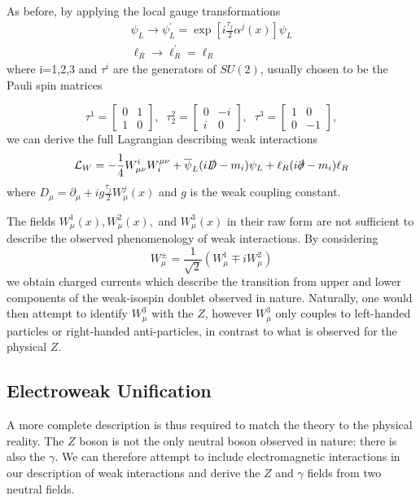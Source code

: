 \documentclass[10pt,a4paper]{book}
\begin{document}
As before, by applying the local gauge transformations
\begin{gather}
\label{weak gauge transformations}
\psi_L \rightarrow \psi_L^\prime = \exp\left[i \frac{\tau_j}{2}\alpha^j (x) \right]\psi_L \\
\ell_R \rightarrow \ell_R^\prime = \ell_R
\label{weak gauge transformations 2}
\end{gather}
where i=1,2,3 and $\tau^i$ are the generators of $SU(2)$, usually chosen to be the Pauli spin matrices

\begin{equation}
\tau^1 = \begin{bmatrix}
0 & 1  \\
1 & 0
\end{bmatrix}, \; \;
\tau^2_2 = \begin{bmatrix}
0 & -i  \\
i & 0
\end{bmatrix}, \; \;
\tau^3 = \begin{bmatrix}
1 & 0 \\
0 & -1
\end{bmatrix},
\end{equation}
we can derive the full Lagrangian describing weak interactions
\begin{equation}
\mathcal{L}_W = -\frac{1}{4}W^i_{\mu\nu}W^{\mu\nu}_i + \overline{\psi}_L(i\slashed{D} - m_i)\psi_{L} +  \ell_{R}(i\slashed{\partial} -m_i)\ell_{R}
\end{equation}
where $D_\mu = \partial_\mu +ig \frac{\tau_j}{2}W^j_\mu(x)$ and $g$ is the weak coupling constant.

The fields $W^1_\mu(x), W^2_\mu(x),$ and $W^3_\mu(x)$ in their raw form are not sufficient to describe the observed phenomenology of weak interactions. By considering 
\begin{equation}
\label{W pm}
W^\pm_\mu = \frac{1}{\sqrt{2}}\left(W_\mu^1 \mp i W^2_\mu \right)
\end{equation}
we obtain charged currents which describe the transition from upper and lower components of the weak-isospin doublet observed in nature. Naturally, one would then attempt to identify $W^3_\mu$ with the $Z$, however $W^3_\mu$ only couples to left-handed particles or right-handed anti-particles, in contrast to what is observed for the physical $Z$. 

\subsection{Electroweak Unification}
A more complete description is thus required to match the theory to the physical reality. The $Z$ boson is not the only neutral boson observed in nature: there is also the $\gamma$. We can therefore attempt to include electromagnetic interactions in our description of weak interactions and derive the $Z$ and $\gamma$ fields from two neutral fields.
\end{document}

